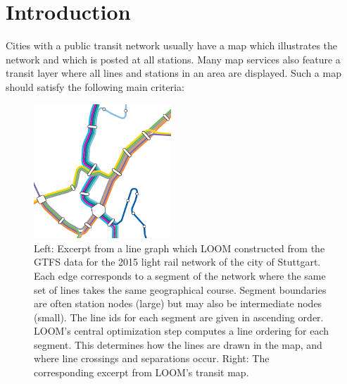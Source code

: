 \documentclass[format=acmsmall, review=false, screen=true]{acmart}
\begin{document}


\maketitle

\section{Introduction}\label{SEC:intro}
%

Cities with a public transit network usually have a map which illustrates the network and which is posted at all stations. Many map services also feature a transit layer where all lines and stations in an area are displayed.
Such a map should satisfy the following main criteria:\vspace{0pt}



\begin{figure}[t]
  \centering
  
  \hspace{0.5cm}
  \includegraphics[trim={0cm 0 2.47cm 4.07cm},clip,width=0.46\textwidth]{figures/render_examples/vvs_cropped.pdf}
  \caption{Left: Excerpt from a line graph which LOOM constructed from the GTFS data for the 2015 light rail network of the city of Stuttgart. Each edge corresponds to a segment of the network where the same set of lines takes the same geographical course. Segment boundaries are often station nodes (large) but may also be intermediate nodes (small). The line ids for each segment are given in ascending order. LOOM's central optimization step computes a line ordering for each segment. This determines how the lines are drawn in the map, and where line crossings and separations occur. Right: The corresponding excerpt from LOOM's transit map.}
  \label{FIG:transitgraphvvs}  
\end{figure}
\end{document}
